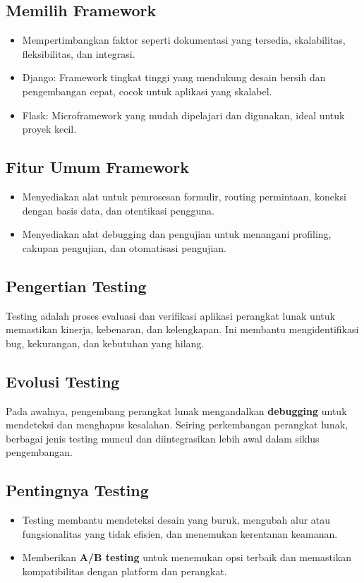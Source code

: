 \documentclass{article}
\begin{document}
\subsection{Memilih Framework}
\begin{itemize}
    \item Mempertimbangkan faktor seperti dokumentasi yang tersedia, skalabilitas, fleksibilitas, dan integrasi.
    \item Django: Framework tingkat tinggi yang mendukung desain bersih dan pengembangan cepat, cocok untuk aplikasi yang skalabel.
    \item Flask: Microframework yang mudah dipelajari dan digunakan, ideal untuk proyek kecil.
\end{itemize}

\subsection{Fitur Umum Framework}
\begin{itemize}
    \item Menyediakan alat untuk pemrosesan formulir, routing permintaan, koneksi dengan basis data, dan otentikasi pengguna.
    \item Menyediakan alat debugging dan pengujian untuk menangani profiling, cakupan pengujian, dan otomatisasi pengujian.
\end{itemize}

\subsection{Pengertian Testing}
Testing adalah proses evaluasi dan verifikasi aplikasi perangkat lunak untuk memastikan kinerja, kebenaran, dan kelengkapan. Ini membantu mengidentifikasi bug, kekurangan, dan kebutuhan yang hilang.

\subsection{Evolusi Testing}
Pada awalnya, pengembang perangkat lunak mengandalkan \textbf{debugging} untuk mendeteksi dan menghapus kesalahan. Seiring perkembangan perangkat lunak, berbagai jenis testing muncul dan diintegrasikan lebih awal dalam siklus pengembangan.

\subsection{Pentingnya Testing}
\begin{itemize}
    \item Testing membantu mendeteksi desain yang buruk, mengubah alur atau fungsionalitas yang tidak efisien, dan menemukan kerentanan keamanan.
    \item Memberikan \textbf{A/B testing} untuk menemukan opsi terbaik dan memastikan kompatibilitas dengan platform dan perangkat.
\end{itemize}
\end{document}
